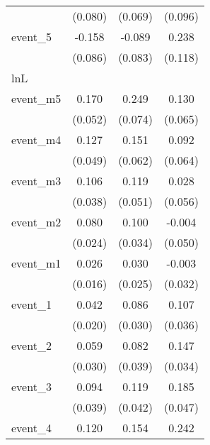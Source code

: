 {\begin{tabular}{l*{3}{c}}
            &     (0.080)         &     (0.069)         &     (0.096)         \\
[1em]
event\_5     &      -0.158         &      -0.089         &       0.238\sym{*}  \\
            &     (0.086)         &     (0.083)         &     (0.118)         \\
\hline
lnL         &                     &                     &                     \\
event\_m5    &       0.170\sym{**} &       0.249\sym{***}&       0.130\sym{*}  \\
            &     (0.052)         &     (0.074)         &     (0.065)         \\
[1em]
event\_m4    &       0.127\sym{**} &       0.151\sym{*}  &       0.092         \\
            &     (0.049)         &     (0.062)         &     (0.064)         \\
[1em]
event\_m3    &       0.106\sym{**} &       0.119\sym{*}  &       0.028         \\
            &     (0.038)         &     (0.051)         &     (0.056)         \\
[1em]
event\_m2    &       0.080\sym{**} &       0.100\sym{**} &      -0.004         \\
            &     (0.024)         &     (0.034)         &     (0.050)         \\
[1em]
event\_m1    &       0.026         &       0.030         &      -0.003         \\
            &     (0.016)         &     (0.025)         &     (0.032)         \\
[1em]
event\_1     &       0.042\sym{*}  &       0.086\sym{**} &       0.107\sym{**} \\
            &     (0.020)         &     (0.030)         &     (0.036)         \\
[1em]
event\_2     &       0.059         &       0.082\sym{*}  &       0.147\sym{***}\\
            &     (0.030)         &     (0.039)         &     (0.034)         \\
[1em]
event\_3     &       0.094\sym{*}  &       0.119\sym{**} &       0.185\sym{***}\\
            &     (0.039)         &     (0.042)         &     (0.047)         \\
[1em]
event\_4     &       0.120\sym{*}  &       0.154\sym{**} &       0.242\sym{***}\\

\end{tabular}}
